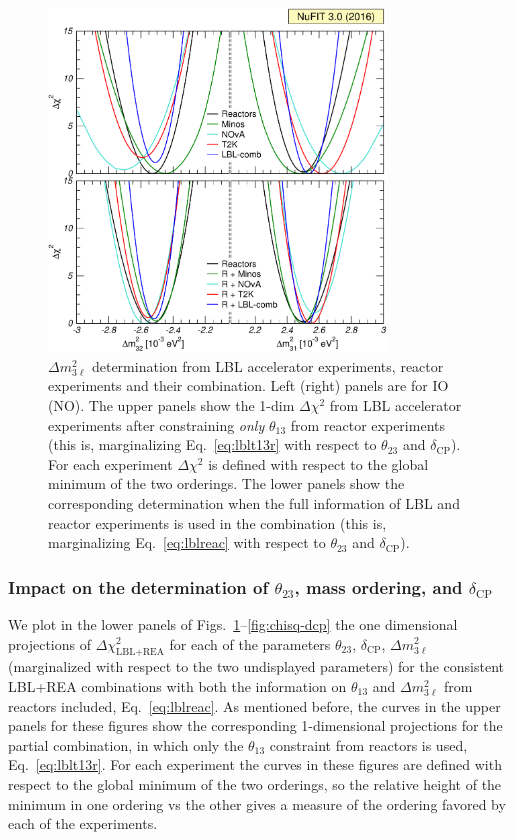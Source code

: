 \documentclass[a4paper, 11pt]{article}
\newcommand{\Dmq}{\Delta m^2}
\begin{document}
\begin{figure}\centering
\includegraphics[width=0.8\textwidth]{fig-chisq-dma}
\caption{$\Dmq_{3\ell}$ determination from LBL accelerator
  experiments, reactor experiments and their combination. Left (right)
  panels are for IO (NO). The upper panels show the 1-dim
  $\Delta\chi^2$ from LBL accelerator experiments after constraining
  \emph{only} $\theta_{13}$ from reactor experiments (this is,
  marginalizing Eq.~\eqref{eq:lblt13r} with respect to $\theta_{23}$
  and $\delta_\text{CP}$). For each experiment $\Delta\chi^2$ is
  defined with respect to the global minimum of the two orderings.
  The lower panels show the corresponding determination when the full
  information of LBL and reactor experiments is used in the
  combination (this is, marginalizing Eq.~\eqref{eq:lblreac} with
  respect to $\theta_{23}$ and $\delta_\text{CP}$).}
 \label{fig:chisq-dma}
\end{figure}

\subsubsection{Impact on the determination of $\theta_{23}$, mass ordering, and
  $\delta_\text{CP}$}
\label{subsec:t23ordcp}

We plot in the lower panels of
Figs.~\ref{fig:chisq-dma}--\ref{fig:chisq-dcp} the one dimensional
projections of $\Delta\chi^2_\text{LBL+REA}$ for each of the
parameters $\theta_{23}$, $\delta_\text{CP}$, $\Dmq_{3\ell}$
(marginalized with respect to the two undisplayed parameters) for the
consistent LBL+REA combinations with both the information on
$\theta_{13}$ and $\Dmq_{3\ell}$ from reactors included,
Eq.~\eqref{eq:lblreac}.  As mentioned before, the curves in the upper
panels for these figures show the corresponding 1-dimensional
projections for the partial combination, in which only the
$\theta_{13}$ constraint from reactors is used,
Eq.~\eqref{eq:lblt13r}.  For each experiment the curves in these
figures are defined with respect to the global minimum of the two
orderings, so the relative height of the minimum in one ordering vs
the other gives a measure of the ordering favored by each of the
experiments.
\end{document}
